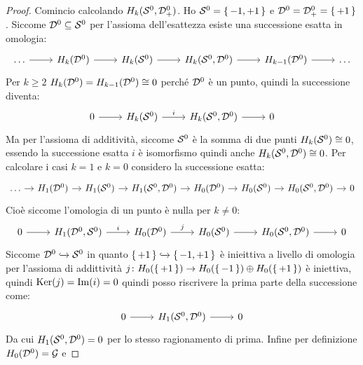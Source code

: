 \begin{proof}
  Comincio calcolando $ H_k(\mathcal{S}^{0}, \mathcal{D}^{0}_+) $.
  Ho $ \mathcal{S}^{0} = \set{-1, +1} $ e $ \mathcal{D}^{0} = \mathcal{D}^{0}_+ = \set{+ 1} $.
  Siccome $ \mathcal{D}^{0} \subseteq \mathcal{S}^{0} $ per l'assioma dell'esattezza esiste
  una successione esatta in omologia:
  \[
    \begin{tikzcd}
      \dots \rar & H_k(\Disk{0}) \rar & H_k(\Sph{0}) \rar & H_k(\Sph{0}, \Disk{0}) \rar & H_{k-1}(\Disk{0}) \rar & \dots
    \end{tikzcd}
  \]
  Per $ k \geq 2 $ $ H_k(\mathcal{D}^{0}) = H_{k-1}(\mathcal{D}^{0}) \cong 0 $ perché $ \mathcal{D}^{0} $ è un punto, quindi
  la successione diventa:
  \[
    \begin{tikzcd}
      0 \rar & H_k(\Sph{0}) \rar{i} & H_k(\Sph{0}, \Disk{0}) \rar{} & 0
    \end{tikzcd}
  \]
  Ma per l'assioma di additività, siccome $ \mathcal{S}^{0} $ è la somma di due punti
  $ H_k(\mathcal{S}^{0}) \cong 0 $, essendo la successione esatta
  $ i $ è isomorfismo quindi anche $ H_k(\mathcal{S}^{0}, \mathcal{D}^{0}) \cong 0 $.
  Per calcolare
  i casi $ k = 1 $ e $ k = 0 $ considero la successione esatta:
  \[
    \begin{tikzcd}[nodes={column sep=10pt, inner sep=4pt}]
      \dots \rar & H_1(\Disk{0}) \rar & H_1(\Sph{0}) \rar & H_1(\Sph{0}, \Disk{0}) \rar
      & H_0(\Disk{0}) \rar & H_{0}(\Sph{0}) \rar & H_0(\Sph{0}, \Disk{0}) \rar & 0
    \end{tikzcd}
  \]
  Cioè siccome l'omologia di un punto è nulla per $ k \not = 0 $:
  \[
    \begin{tikzcd}
       0 \rar & H_1(\Disk{0}, \Sph{0}) \rar{i}
      & H_0(\Disk{0}) \rar{j} & H_{0}(\Sph{0}) \rar & H_0(\Sph{0}, \Disk{0}) \rar & 0
    \end{tikzcd}
  \]
  Siccome $ \mathcal{D}^{0} \xhookrightarrow{} \mathcal{S}^{0} $ in quanto $ \set{+1} \xhookrightarrow{} \set{-1, +1} $ è inieittiva
  a livello di omologia per l'assioma di addittività $ j \colon H_0(\set{+1}) \to H_0(\set{-1}) \oplus H_0(\set{+1}) $
  è iniettiva, quindi $ \mathrm{Ker}( j) = \mathrm{Im}( i ) = 0 $ quindi posso riscrivere la prima
  parte della successione come:
  \[
    \begin{tikzcd}
      0 \rar & H_1(\Sph{0},\Disk{0}) \rar & 0
    \end{tikzcd}
  \]
  Da cui $ H_1(\mathcal{S}^{0},\mathcal{D}^{0}) = 0 $ per lo stesso ragionamento di prima.
  Infine per definizione $ H_0(\mathcal{D}^{0}) = \mathcal{G} $ e

\end{proof}
